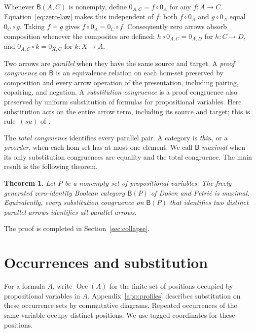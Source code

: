\documentclass[11pt]{article}
\newtheorem{theorem}{Theorem}[section]
\newcommand{\B}{\mathsf B}
\newcommand{\Occ}{\operatorname{Occ}}
\begin{document}
Whenever $\B(A,C)$ is nonempty, define $0_{A,C}=f\circ0_A$ for any
$f:A\to C$. Equation~\eqref{eq:zero-law} makes this independent of
$f$: both $f\circ0_A$ and $g\circ0_A$ equal $0_C\circ g$.
Taking $f=g$ gives $f\circ0_A=0_C\circ f$. Consequently zero arrows
absorb composition whenever the composites are defined:
$h\circ0_{A,C}=0_{A,D}$ for $h:C\to D$, and
$0_{A,C}\circ k=0_{X,C}$ for $k:X\to A$.

Two arrows are \emph{parallel} when they have the same source and
target. A \emph{proof congruence} on $\B$ is an equivalence relation
on each hom-set preserved by composition and every arrow operation
of the presentation, including pairing, copairing, and negation.
A \emph{substitution congruence} is a proof congruence also preserved
by uniform substitution of formulas for propositional variables.
Here substitution acts on the entire arrow term, including its source
and target; this is rule~$(su)$ of \cite[\S2.7, p.~51]{DP}.

The \emph{total congruence} identifies every parallel pair. A category
is \emph{thin}, or a \emph{preorder}, when each hom-set has at most one
element. We call $\B$ \emph{maximal} when its only substitution
congruences are equality and the total congruence. The main result is
the following theorem.

\begin{theorem}\label{thm:main}
Let $P$ be a nonempty set of propositional variables. The freely
generated zero-identity Boolean category $\B(P)$ of Do\v{s}en and
Petri\'c is maximal. Equivalently, every substitution congruence on
$\B(P)$ that identifies two distinct parallel arrows identifies all
parallel arrows.
\end{theorem}

The proof is completed in Section~\ref{sec:collapse}.

\section{Occurrences and substitution}\label{sec:occurrences}

For a formula $A$, write $\Occ(A)$ for the finite set of positions
occupied by propositional variables in $A$.
Appendix~\ref{app:profiles} describes substitution on these occurrence
sets by commutative diagrams. Repeated occurrences of the same variable
occupy distinct positions. We use tagged coordinates for these positions.
\end{document}
